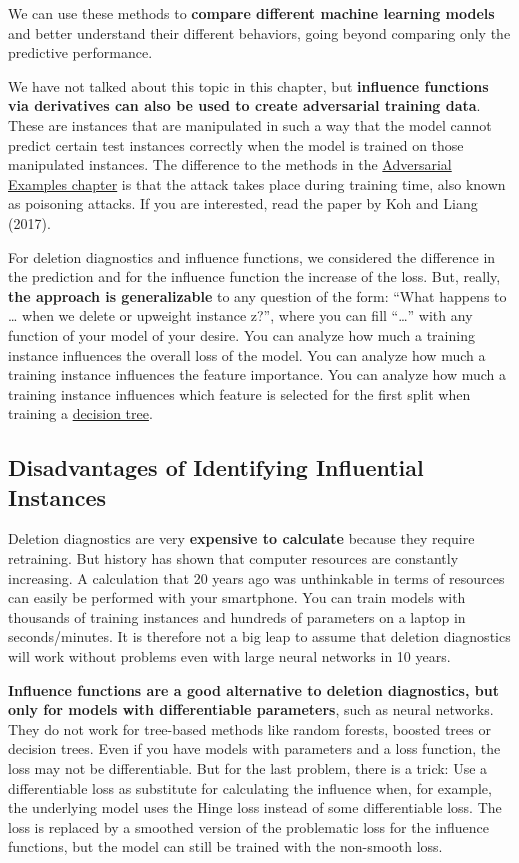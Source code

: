 \documentclass[12pt,]{krantz}
\begin{document}
We can use these methods to \textbf{compare different machine learning
models} and better understand their different behaviors, going beyond
comparing only the predictive performance.

We have not talked about this topic in this chapter, but
\textbf{influence functions via derivatives can also be used to create
adversarial training data}. These are instances that are manipulated in
such a way that the model cannot predict certain test instances
correctly when the model is trained on those manipulated instances. The
difference to the methods in the
\protect\hyperlink{adversarial}{Adversarial Examples chapter} is that
the attack takes place during training time, also known as poisoning
attacks. If you are interested, read the paper by Koh and Liang (2017).

For deletion diagnostics and influence functions, we considered the
difference in the prediction and for the influence function the increase
of the loss. But, really, \textbf{the approach is generalizable} to any
question of the form: ``What happens to \ldots{} when we delete or
upweight instance z?'', where you can fill ``\ldots{}'' with any
function of your model of your desire. You can analyze how much a
training instance influences the overall loss of the model. You can
analyze how much a training instance influences the feature importance.
You can analyze how much a training instance influences which feature is
selected for the first split when training a
\protect\hyperlink{tree}{decision tree}.

\subsection{Disadvantages of Identifying Influential
Instances}\label{disadvantages-of-identifying-influential-instances}

Deletion diagnostics are very \textbf{expensive to calculate} because
they require retraining. But history has shown that computer resources
are constantly increasing. A calculation that 20 years ago was
unthinkable in terms of resources can easily be performed with your
smartphone. You can train models with thousands of training instances
and hundreds of parameters on a laptop in seconds/minutes. It is
therefore not a big leap to assume that deletion diagnostics will work
without problems even with large neural networks in 10 years.

\textbf{Influence functions are a good alternative to deletion
diagnostics, but only for models with differentiable parameters}, such
as neural networks. They do not work for tree-based methods like random
forests, boosted trees or decision trees. Even if you have models with
parameters and a loss function, the loss may not be differentiable. But
for the last problem, there is a trick: Use a differentiable loss as
substitute for calculating the influence when, for example, the
underlying model uses the Hinge loss instead of some differentiable
loss. The loss is replaced by a smoothed version of the problematic loss
for the influence functions, but the model can still be trained with the
non-smooth loss.
\end{document}
